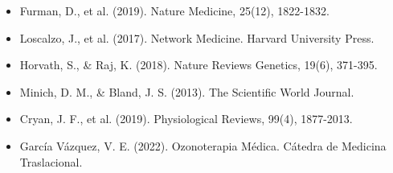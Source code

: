         \begin{itemize}
            \item Furman, D., et al. (2019). Nature Medicine, 25(12), 1822-1832.
            \item Loscalzo, J., et al. (2017). Network Medicine. Harvard University Press.
            \item Horvath, S., & Raj, K. (2018). Nature Reviews Genetics, 19(6), 371-395.
            \item Minich, D. M., & Bland, J. S. (2013). The Scientific World Journal.
            \item Cryan, J. F., et al. (2019). Physiological Reviews, 99(4), 1877-2013.
            \item García Vázquez, V. E. (2022). Ozonoterapia Médica. Cátedra de Medicina Traslacional.
        \end{itemize}
